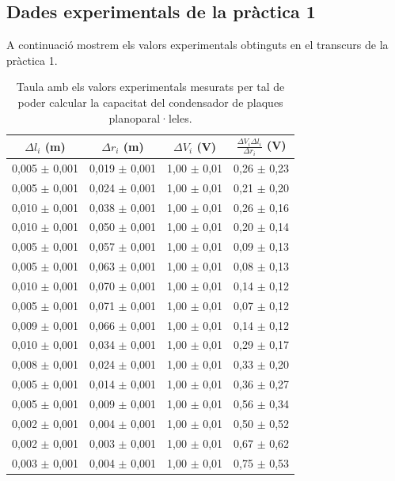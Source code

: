 \documentclass[a4paper,10.5pt]{report}
\begin{document}
\begin{appendices}
\subsection{Dades experimentals de la pràctica 1}
\label{an:a2}
A continuació mostrem els valors experimentals obtinguts en el transcurs de la pràctica 1.
\begin{table}[h]
	\centering
	\renewcommand{\arraystretch}{1.2}
	\caption{Taula amb els valors experimentals mesurats per tal de poder calcular la capacitat del condensador de plaques planoparal·leles.}
	\begin{tabular}{cccc}
		\toprule
		$\Delta l_i$ (m) & $\Delta r_i$ (m) & $\Delta V_i$ (V) & $\frac{\Delta V_i\Delta l_i}{\Delta r_i}$ (V)\\
		\midrule
		0,005 $\pm$ 0,001 & 0,019 $\pm$ 0,001 & 1,00 $\pm$ 0,01 & 0,26 $\pm$ 0,23 \\
		0,005 $\pm$ 0,001 & 0,024 $\pm$ 0,001 & 1,00 $\pm$ 0,01 & 0,21 $\pm$ 0,20 \\
		0,010 $\pm$ 0,001 & 0,038 $\pm$ 0,001 & 1,00 $\pm$ 0,01 & 0,26 $\pm$ 0,16 \\
		0,010 $\pm$ 0,001 & 0,050 $\pm$ 0,001 & 1,00 $\pm$ 0,01 & 0,20 $\pm$ 0,14 \\
		0,005 $\pm$ 0,001 & 0,057 $\pm$ 0,001 & 1,00 $\pm$ 0,01 & 0,09 $\pm$ 0,13 \\
		0,005 $\pm$ 0,001 & 0,063 $\pm$ 0,001 & 1,00 $\pm$ 0,01 & 0,08 $\pm$ 0,13 \\
		0,010 $\pm$ 0,001 & 0,070 $\pm$ 0,001 & 1,00 $\pm$ 0,01 & 0,14 $\pm$ 0,12 \\
		0,005 $\pm$ 0,001 & 0,071 $\pm$ 0,001 & 1,00 $\pm$ 0,01 & 0,07 $\pm$ 0,12 \\
		0,009 $\pm$ 0,001 & 0,066 $\pm$ 0,001 & 1,00 $\pm$ 0,01 & 0,14 $\pm$ 0,12 \\
		0,010 $\pm$ 0,001 & 0,034 $\pm$ 0,001 & 1,00 $\pm$ 0,01 & 0,29 $\pm$ 0,17 \\
		0,008 $\pm$ 0,001 & 0,024 $\pm$ 0,001 & 1,00 $\pm$ 0,01 & 0,33 $\pm$ 0,20 \\
		0,005 $\pm$ 0,001 & 0,014 $\pm$ 0,001 & 1,00 $\pm$ 0,01 & 0,36 $\pm$ 0,27 \\
		0,005 $\pm$ 0,001 & 0,009 $\pm$ 0,001 & 1,00 $\pm$ 0,01 & 0,56 $\pm$ 0,34 \\
		0,002 $\pm$ 0,001 & 0,004 $\pm$ 0,001 & 1,00 $\pm$ 0,01 & 0,50 $\pm$ 0,52 \\
		0,002 $\pm$ 0,001 & 0,003 $\pm$ 0,001 & 1,00 $\pm$ 0,01 & 0,67 $\pm$ 0,62 \\
		0,003 $\pm$ 0,001 & 0,004 $\pm$ 0,001 & 1,00 $\pm$ 0,01 & 0,75 $\pm$ 0,53 \\

\end{tabular}
\end{table}
\end{appendices}
\end{document}
